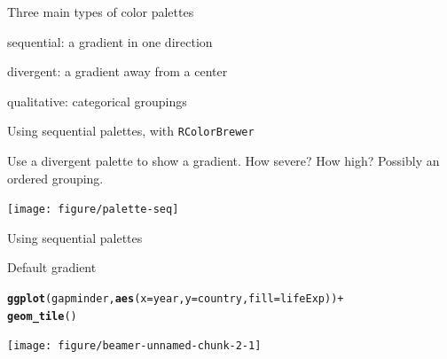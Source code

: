 \documentclass[table]{beamer}\usepackage[]{graphicx}\usepackage[]{color}
\makeatletter
\newcommand{\hlstr}[1]{\textcolor[rgb]{0.192,0.494,0.8}{#1}}%
\newcommand{\hlopt}[1]{\textcolor[rgb]{0,0,0}{#1}}%
\newcommand{\hlstd}[1]{\textcolor[rgb]{0.345,0.345,0.345}{#1}}%
\newcommand{\hlkwb}[1]{\textcolor[rgb]{0.69,0.353,0.396}{#1}}%
\newcommand{\hlkwc}[1]{\textcolor[rgb]{0.333,0.667,0.333}{#1}}%
\newcommand{\hlkwd}[1]{\textcolor[rgb]{0.737,0.353,0.396}{\textbf{#1}}}%
\newenvironment{kframe}{%
 \def\at@end@of@kframe{}%
 \ifinner\ifhmode%
  \def\at@end@of@kframe{\end{minipage}}%
  \begin{minipage}{\columnwidth}%
 \fi\fi%
 \def\FrameCommand##1{\hskip\@totalleftmargin \hskip-\fboxsep
 \colorbox{shadecolor}{##1}\hskip-\fboxsep
     \hskip-\linewidth \hskip-\@totalleftmargin \hskip\columnwidth}%
 \MakeFramed {\advance\hsize-\width
   \@totalleftmargin\z@ \linewidth\hsize
   \@setminipage}}%
 {\par\unskip\endMakeFramed%
 \at@end@of@kframe}
\newenvironment{knitrout}{}{} %
\makeatother
\begin{document}

\begin{frame}[fragile]{Three main types of color palettes}


\bi
  \item sequential: a gradient in one direction
  \item divergent: a gradient away from a center
  \item qualitative: categorical groupings 
\ei


\end{frame}



\begin{frame}[fragile]{Using sequential palettes, with {\tt RColorBrewer}}

\begin{block}{Use a divergent palette to show a gradient.}
How severe? How high? Possibly an ordered grouping.

\texttt{[image: figure/palette-seq]}

\end{block}

\end{frame}



\begin{frame}[fragile]{Using sequential palettes}

Default gradient
\begin{knitrout}\tiny
{}\color{fgcolor}\begin{kframe}
\begin{alltt}
\hlkwd{ggplot}\hlstd{(gapminder,} \hlkwd{aes}\hlstd{(}\hlkwc{x}\hlstd{=year,} \hlkwc{y}\hlstd{=country,} \hlkwc{fill}\hlstd{=lifeExp))} \hlopt{+}
  \hlkwd{geom_tile}\hlstd{()}
\end{alltt}
\end{kframe}

{\centering \texttt{[image: figure/beamer-unnamed-chunk-2-1]} 

}



\end{knitrout}

\end{frame}
\end{document}
